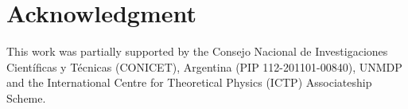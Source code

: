 \documentclass[a4paper]{elsart}
\begin{document}










\section*{Acknowledgment}
This work was partially supported by the Consejo Nacional de Investigaciones Científicas y Técnicas (CONICET), Argentina (PIP 112-201101-00840), UNMDP and the International Centre for Theoretical Physics (ICTP) Associateship Scheme.



\end{document}
